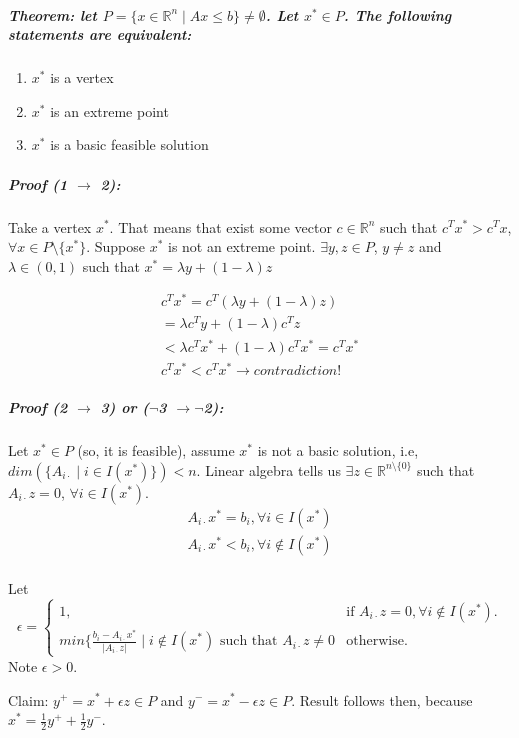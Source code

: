 \documentclass[main]{subfiles}
\begin{document}
\subparagraph{Theorem: let $P=\{x \in \mathbb{R}^{n} \mid Ax \leq b \} \neq \emptyset$. Let
$x^{*} \in P$. The following statements are equivalent:}
\begin{enumerate}
\item $x^{*}$ is a vertex
\item $x^{*}$ is an extreme point
\item $x^{*}$ is a basic feasible solution
\end{enumerate}

\subparagraph{Proof (1 $\rightarrow$ 2):} Take a vertex $x^{*}$. That means that exist some
vector $c \in \mathbb{R}^{n}$ such that $c^{T}x^{*} > c^{T}x$, $\forall x \in
P\setminus\{x^{*}\}$. Suppose $x^{*}$ is not an extreme point.
$\exists y, z \in P$, $y \neq z$ and $\lambda \in (0,1)$ such that
$x^{*} = \lambda y + (1 - \lambda) z$

\begin{gather*}
c^{T}x^{*} = c^{T}(\lambda y + (1 - \lambda)z) \\
= \lambda c^{T}y + (1 - \lambda) c^{T}z \\
< \lambda c^{T}x^{*} + (1-\lambda) c^{T}x^{*} = c^{T}x^{*} \\
c^{T}x^{*} < c^{T}x^{*} \rightarrow contradiction!
\end{gather*}

\subparagraph{Proof (2 $\rightarrow$ 3) or ($\neg$3 $\rightarrow \neg$2):} Let $x^{*} \in P$ (so, it is feasible), assume $x^{*}$ is not a basic solution, i.e, $dim(\{A_{i\cdot} \mid i \in I(x^{*})\}) < n$.
Linear algebra tells us $\exists z \in \mathbb{R}^{n \setminus \{0\}}$ such that $A_{i\cdot} z = 0$, $\forall i \in I(x^{*})$.
\begin{gather*}
A_{i\cdot} x^{*} = b_{i}, \forall i \in I(x^{*}) \\
A_{i\cdot} x^{*} < b_{i}, \forall i \notin I(x^{*}) \\
\end{gather*}

Let
\begin{equation}
  \epsilon=\begin{cases}
    1, & \text{if $A_{i\cdot}z = 0, \forall i \notin I(x^{*})$}.\\
    min\{\frac{b_{i} - A_{i\cdot}x^{*}}{|A_{i\cdot}z|} \mid i \notin I(x^{*}) \text{ such that } A_{i\cdot}z \neq 0 & \text{otherwise}.
  \end{cases}
\end{equation}
Note $\epsilon > 0$.

Claim: $y^{+} = x^{*} + \epsilon z \in P$ and $y^{-} = x^{*} - \epsilon z \in P$. Result follows then, because
$x^{*} = \frac{1}{2}y^{+} + \frac{1}{2}y^{-}$.
\end{document}
